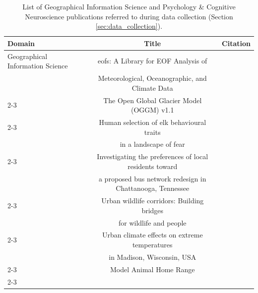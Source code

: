 \begin{table}[h]
\scriptsize
\centering
\caption{List of Geographical Information Science and Psychology \& Cognitive Neuroscience publications referred to during data collection (Section \ref{sec:data_collection}).}
\begin{tabular}{lcc}
\toprule
\textbf{Domain} & \textbf{Title} & \textbf{Citation}\\
\midrule

\multirow{28.5}{*}{Geographical Information Science} & eofs: A Library for EOF Analysis of & \multirow{2}{*}{\citet{Andrew2016eofs}} \\
 & Meteorological, Oceanographic, and Climate Data & \\
\cmidrule(lr){2-3}

 & The Open Global Glacier Model (OGGM) v1.1 & \citet{gmd-12-909-2019} \\
\cmidrule(lr){2-3}

 & Human selection of elk behavioural traits & \multirow{2}{*}{\citet{Ciuti2012}} \\
 & in a landscape of fear & \\
 \cmidrule(lr){2-3}

 & Investigating the preferences of local residents toward  & \multirow{2}{*}{\citet{ziedan2021investigating}} \\
 & a proposed bus network redesign in Chattanooga, Tennessee & \\
\cmidrule(lr){2-3}

 & Urban wildlife corridors: Building bridges  & \multirow{2}{*}{\citet{zellmer2022urban}} \\
 & for wildlife and people & \\
\cmidrule(lr){2-3}

 & Urban climate effects on extreme temperatures & \multirow{2}{*}{\citet{schatz2015urban}} \\
 & in Madison, Wisconsin, USA & \\
\cmidrule(lr){2-3}

 & Model Animal Home Range & \citet{Fleming_2024} \\
\cmidrule(lr){2-3}


\end{tabular}
\end{table}
